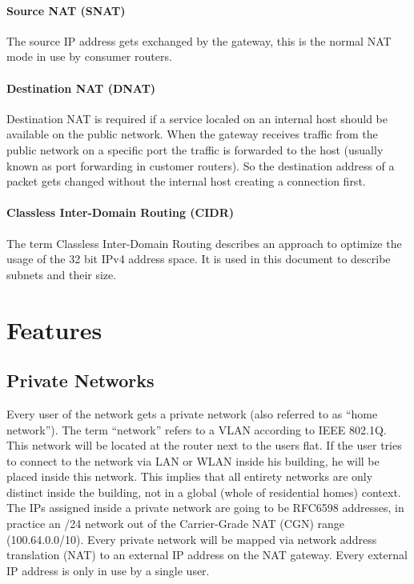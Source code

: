 \documentclass{report}
\begin{document}
\paragraph{Source NAT (SNAT)}

The source IP address gets exchanged by the gateway, this is the normal
NAT mode in use by consumer routers.

\paragraph{Destination NAT (DNAT)}

Destination NAT is required if a service localed on an internal host should be available on
the public network. When the gateway receives traffic from the public
network on a specific port the traffic is forwarded to the host (usually
known as port forwarding in customer routers). So the destination
address of a packet gets changed without the internal host creating a
connection first.

\paragraph{Classless Inter-Domain Routing (CIDR)}

The term Classless Inter-Domain Routing describes an approach to optimize
the usage of the 32 bit IPv4 address space. It is used in this document
to describe subnets and their size.

\section{Features}\label{features}

\subsection{Private Networks}\label{private-networks}

Every user of the network gets a private network (also
referred to as ``home network''). The term ``network'' refers to a VLAN
according to IEEE 802.1Q\cite{802.1Q}. This network will be located at the router
next to the users flat. If the user tries to connect to the network via
LAN or WLAN inside his building, he will be placed inside this network. This
implies that all entirety networks are only distinct inside the building,
not in a global (whole of residential homes) context. The IPs assigned inside a private network are
going to be RFC6598 addresses\cite{CGN}, in practice an /24 network out of the
Carrier-Grade NAT (CGN) range (100.64.0.0/10). Every private network
will be mapped via network address translation (NAT\cite{NAT}) to an external IP
address on the NAT gateway. Every external IP address is only in use by a single user.
\end{document}
